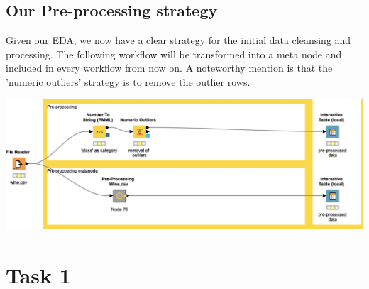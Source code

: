 \documentclass[11pt]{article}
\begin{document}
		\subsection*{Our Pre-processing strategy}
			Given our EDA, we now have a clear strategy for the initial data cleansing and processing. The following workflow will be transformed into a meta node and included in every workflow from now on. A noteworthy mention is that the 'numeric outliers' strategy is to remove the outlier rows.
			\iftrue
			\begin{center}
				\includegraphics[scale=0.5]{res/t0/t05/t05-workflow}
			\end{center}
			\fi
			

	\section*{Task 1}
\end{document}
